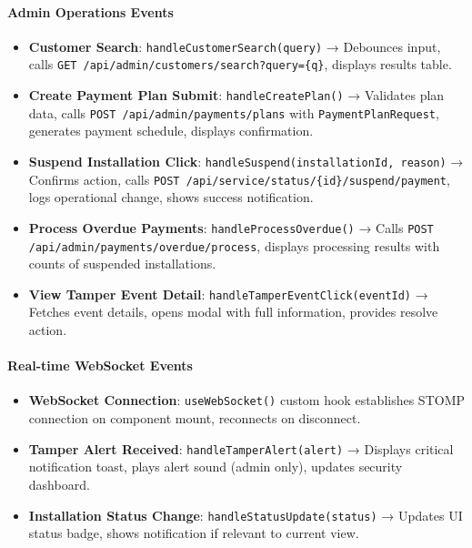 \paragraph{Admin Operations Events}
\begin{itemize}
    \item \textbf{Customer Search}: \texttt{handleCustomerSearch(query)} → Debounces input, calls \texttt{GET /api/admin/customers/search?query=\{q\}}, displays results table.
    \item \textbf{Create Payment Plan Submit}: \texttt{handleCreatePlan()} → Validates plan data, calls \texttt{POST /api/admin/payments/plans} with \texttt{PaymentPlanRequest}, generates payment schedule, displays confirmation.
    \item \textbf{Suspend Installation Click}: \texttt{handleSuspend(installationId, reason)} → Confirms action, calls \texttt{POST /api/service/status/\{id\}/suspend/payment}, logs operational change, shows success notification.
    \item \textbf{Process Overdue Payments}: \texttt{handleProcessOverdue()} → Calls \texttt{POST /api/admin/payments/overdue/process}, displays processing results with counts of suspended installations.
    \item \textbf{View Tamper Event Detail}: \texttt{handleTamperEventClick(eventId)} → Fetches event details, opens modal with full information, provides resolve action.
\end{itemize}

\paragraph{Real-time WebSocket Events}
\begin{itemize}
    \item \textbf{WebSocket Connection}: \texttt{useWebSocket()} custom hook establishes STOMP connection on component mount, reconnects on disconnect.
    \item \textbf{Tamper Alert Received}: \texttt{handleTamperAlert(alert)} → Displays critical notification toast, plays alert sound (admin only), updates security dashboard.
    \item \textbf{Installation Status Change}: \texttt{handleStatusUpdate(status)} → Updates UI status badge, shows notification if relevant to current view.
\end{itemize}


